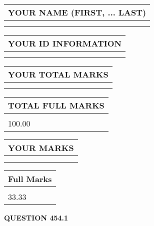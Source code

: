 \documentclass{ctexart}
\begin{document}
   
   
   
\newpage 
\setcounter{page}{ 
   454001 } 
   
   
   
   
\noindent\begin{tabular}{|l|}
\hline
YOUR NAME (FIRST, ... LAST)  \\
\hline
 \\ 
 \\ 
\hline
\end{tabular}
\hspace{0.05in} \begin{tabular}{|l|}
\hline
 YOUR   ID   INFORMATION  \\
\hline
 \\ 
 \\ 
\hline
\end{tabular}
   
   
\vspace{0.2in}\noindent\begin{tabular}{|l|}
\hline
YOUR TOTAL MARKS  \\
\hline
 \\ 
 \\ 
\hline
\end{tabular}
\hspace{0.05in} \begin{tabular}{|l|}
\hline
TOTAL FULL MARKS  \\
\hline
 \\ 
100.00 \\
\hline
\end{tabular}
   
   
 \vspace{0.2in}
 
 
 
 
   
   
  
\vspace{0.2in}
  
\noindent\begin{tabular}{|l|}
\hline
 YOUR MARKS  \\
\hline
 \\ 
 \\ 
\hline
\end{tabular}
\hspace{0.05in} \begin{tabular}{|l|}
\hline
 Full Marks  \\
\hline
 \\ 
33.33 \\
\hline
\end{tabular}
{\textbf{\Large{QUESTION
454.1 
}}}
  
\end{document}

